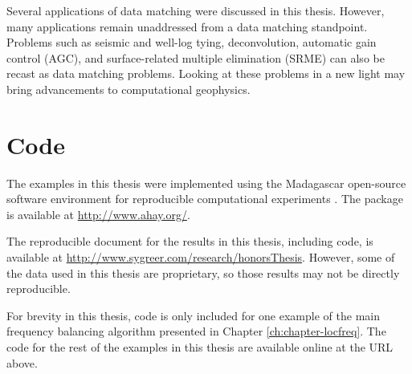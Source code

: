 Several applications of data matching were discussed in this thesis. 
However, many applications remain unaddressed from a data matching standpoint. 
Problems such as seismic and well-log tying, deconvolution, automatic gain control (AGC), and surface-related multiple elimination (SRME) can also be recast as data matching problems. Looking at these problems in a new light may bring advancements to computational geophysics.

\appendix
\section{Code}
The examples in this thesis were implemented using the Madagascar open-source software environment for reproducible computational experiments \cite[]{madagascar}.
The package is available at \url{http://www.ahay.org/}.

The reproducible document for the results in this thesis, including code, is available at \url{http://www.sygreer.com/research/honorsThesis}.
However, some of the data used in this thesis are proprietary, so those results may not be directly reproducible.

For brevity in this thesis, code is only included for one example of the main frequency balancing algorithm presented in Chapter \ref{ch:chapter-locfreq}.
The code for the rest of the examples in this thesis are available online at the URL above.


